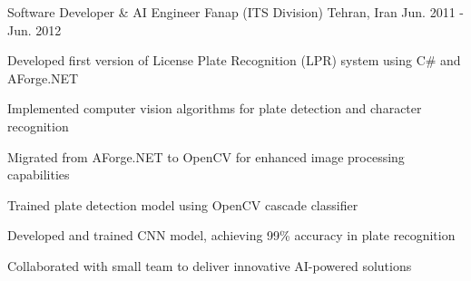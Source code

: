 \begin{cventries}
  \cventry
    {Software Developer \& AI Engineer} %
    {Fanap (ITS Division)} %
    {Tehran, Iran} %
    {Jun. 2011 - Jun. 2012} %
    {
      \begin{cvitems} %
        \item {Developed first version of License Plate Recognition (LPR) system using C\# and AForge.NET}
        \item {Implemented computer vision algorithms for plate detection and character recognition}
        \item {Migrated from AForge.NET to OpenCV for enhanced image processing capabilities}
        \item {Trained plate detection model using OpenCV cascade classifier}
        \item {Developed and trained CNN model, achieving 99\% accuracy in plate recognition}
        \item {Collaborated with small team to deliver innovative AI-powered solutions}
      \end{cvitems}
    }

\end{cventries}
